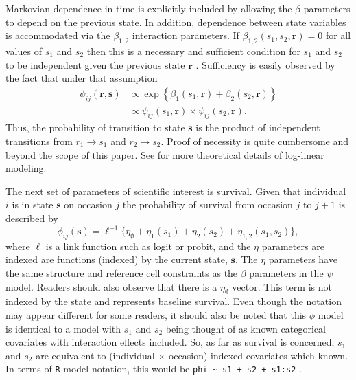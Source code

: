 \documentclass[fleqn]{article}
\newcommand{\bs}{\ensuremath{\mathbf{s}}}
\newcommand{\br}{\ensuremath{\mathbf{r}}}
\begin{document}
Markovian dependence in time is explicitly included by allowing the $\beta$
parameters to depend on the previous state. In addition, dependence between
state variables is accommodated via the $\beta_{1,2}$ interaction parameters. If
$\beta_{1,2}(s_1,s_2,\br)=0$ for all values of $s_1$ and $s_2$ then this is a
necessary and sufficient condition for $s_1$ and $s_2$ to be independent given
the previous state $\br$ \citep{xxx}. Sufficiency is easily observed by the fact
that under that assumption
\begin{equation}
\begin{split}
\psi_{ij}(\br,\bs) &\propto \exp\left\{\beta_1(s_1,\br) + \beta_2(s_2,\br)\right\}\\
 & \propto \psi_{ij}{(s_1,\br)}\times \psi_{ij}{(s_2,\br)}.
 \end{split}
 \end{equation}
Thus, the probability of transition to state $\bs$ is the product of independent transitions from $r_1 \to s_1$ and $r_2 \to s_2$. Proof of necessity is quite cumbersome and beyond the scope of this paper. See \citet{xxx} for more theoretical details of log-linear modeling. 

The next set of parameters of scientific interest is survival. Given that individual $i$ is in state $\bs$ on occasion $j$ the probability of survival from occasion $j$ to $j+1$ is described by
\begin{equation}
\phi_{ij}(\bs) = \ell^{-1}\{\eta_\emptyset + \eta_1(s_1) + \eta_2(s_2) + \eta_{1,2}(s_1,s_2)\},
\end{equation}
where $\ell$ is a link function such as logit or probit, and the $\eta$ parameters are indexed are functions (indexed) by the current state, $\bs$. The $\eta$ parameters have the same structure and reference cell constraints as the $\beta$ parameters  in the $\psi$ model. Readers should also observe that there is a $\eta_\emptyset$ vector. This term is not indexed by the state and represents baseline survival. Even though the notation may appear different for some readers, it should also be noted that this $\phi$ model is identical to a model with $s_1$ and $s_2$ being thought of as known categorical covariates with interaction effects included. So, as far as survival is concerned, $s_1$ and $s_2$ are equivalent to (individual $\times$ occasion) indexed covariates which known. In terms of {\tt R} model notation, this would be \verb#phi ~ s1 + s2 + s1:s2# .
\end{document}
